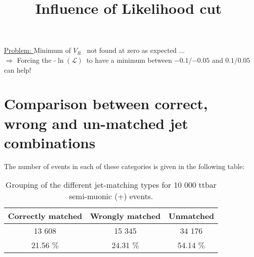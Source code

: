 \documentclass[a4paper,10pt]{article}
\title{Influence of Likelihood cut}
\newcommand{\NegLL}{-$\ln(\mathcal{L})$~}
\newcommand{\VR}{$V_{R}$}
\newcommand{\ttbar}{$t\bar{t}$~}
\begin{document}
\maketitle

\underline{Problem: } Minimum of \VR~ not found at zero as expected ... \\

$\Rightarrow$ Forcing the \NegLL to have a minimum between $-0.1$/$-0.05$ and $0.1$/$0.05$ can help!


\section{Comparison between correct, wrong and un-matched jet combinations}
The number of events in each of these categories is given in the following table:
\begin{table}[!h]
 \centering
 \caption{Grouping of the different jet-matching types for 10 000 ttbar semi-muonic (+) events.}
 \begin{tabular}{c|c|c}
  Correctly matched 	& Wrongly matched  	& Unmatched  	\\
  \hline
  13 608 		& 15 345 		& 34 176    	\\
  21.56 $\%$ 		& 24.31 $\%$		& 54.14 $\%$
 \end{tabular}
\end{table}
\end{document}
